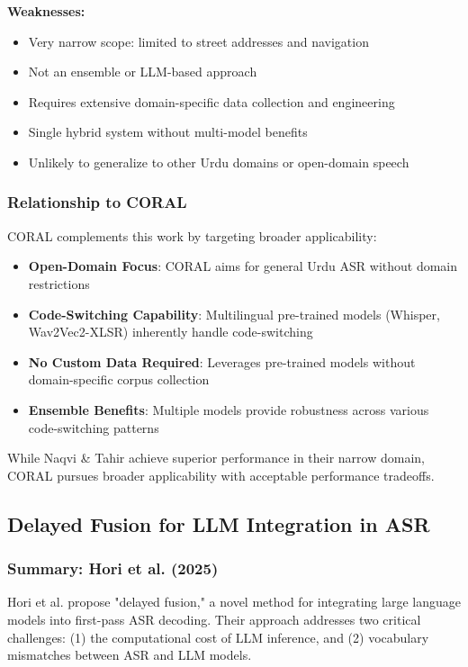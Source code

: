 \textbf{Weaknesses:}
\begin{itemize}[topsep=4pt,itemsep=2pt]
    \item Very narrow scope: limited to street addresses and navigation
    \item Not an ensemble or LLM-based approach
    \item Requires extensive domain-specific data collection and engineering
    \item Single hybrid system without multi-model benefits
    \item Unlikely to generalize to other Urdu domains or open-domain speech
\end{itemize}

\subsubsection{Relationship to CORAL}

CORAL complements this work by targeting broader applicability:

\begin{itemize}[topsep=4pt,itemsep=2pt]
    \item \textbf{Open-Domain Focus}: CORAL aims for general Urdu ASR without domain restrictions
    \item \textbf{Code-Switching Capability}: Multilingual pre-trained models (Whisper, Wav2Vec2-XLSR) inherently handle code-switching
    \item \textbf{No Custom Data Required}: Leverages pre-trained models without domain-specific corpus collection
    \item \textbf{Ensemble Benefits}: Multiple models provide robustness across various code-switching patterns
\end{itemize}

While Naqvi \& Tahir achieve superior performance in their narrow domain, CORAL pursues broader applicability with acceptable performance tradeoffs.

\subsection{Delayed Fusion for LLM Integration in ASR}

\subsubsection{Summary: Hori et al. (2025)}

Hori et al. \cite{hori2025} propose "delayed fusion," a novel method for integrating large language models into first-pass ASR decoding. Their approach addresses two critical challenges: (1) the computational cost of LLM inference, and (2) vocabulary mismatches between ASR and LLM models.

